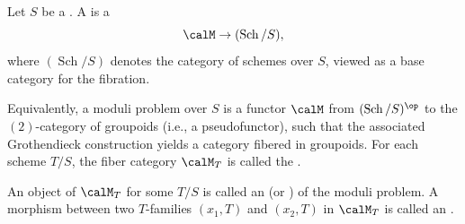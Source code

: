 \begin{definition} \label{definition:moduli_problem_on_schemes}
    Let $S$ be a . A  is a 
    $$\calM \to (\operatorname{Sch}/S),$$
    where $(\operatorname{Sch}/S)$ denotes the category of schemes over $S$, viewed as a base category for the fibration.

    Equivalently, a moduli problem over $S$ is a functor $\calM$ from $(\operatorname{Sch}/S)^{\op}$ to the $(2)$-category of groupoids (i.e., a pseudofunctor), such that the associated Grothendieck construction yields a category fibered in groupoids. For each scheme $T/S$, the fiber category $\calM_T$ is called the .

    An object of $\calM_T$ for some $T/S$ is called an  (or ) of the moduli problem. A morphism between two $T$-families $(x_1, T)$ and $(x_2, T)$ in $\calM_T$ is called an .
\end{definition}

